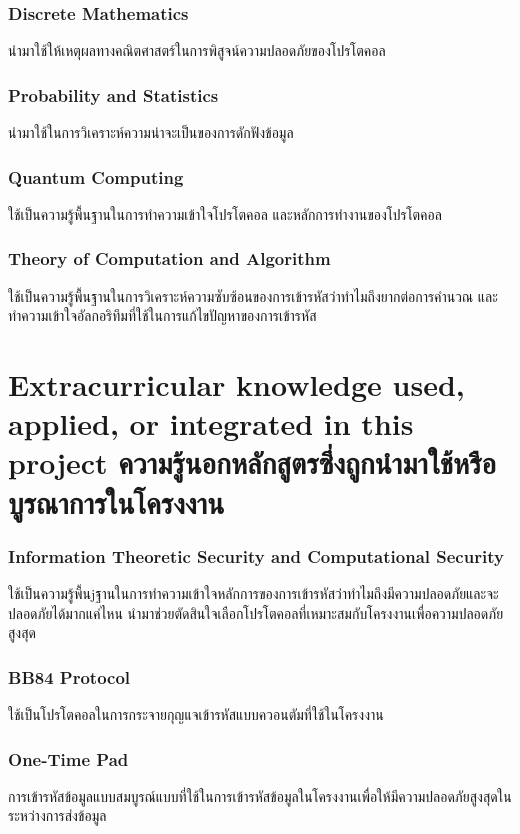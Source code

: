 \subsubsection{Discrete Mathematics}
นำมาใช้ให้เหตุผลทางคณิตศาสตร์ในการพิสูจน์ความปลอดภัยของโปรโตคอล
\subsubsection{Probability and Statistics}
นำมาใช้ในการวิเคราะห์ความน่าจะเป็นของการดักฟังข้อมูล
\subsubsection{Quantum Computing}
ใช้เป็นความรู้พื้นฐานในการทำความเข้าใจโปรโตคอล และหลักการทำงานของโปรโตคอล
\subsubsection{Theory of Computation and Algorithm}
ใช้เป็นความรู้พื้นฐานในการวิเคราะห์ความซับซ้อนของการเข้ารหัสว่าทำไมถึงยากต่อการคำนวณ และทำความเข้าใจอัลกอริทึมที่ใช้ในการแก้ไขปัญหาของการเข้ารหัส

\section{\ifenglish%
Extracurricular knowledge used, applied, or integrated in this project
\else%
ความรู้นอกหลักสูตรซึ่งถูกนำมาใช้หรือบูรณาการในโครงงาน
\fi
}
\subsubsection{Information Theoretic Security and Computational Security}
ใช้เป็นความรู้พื้นjฐานในการทำความเข้าใจหลักการของการเข้ารหัสว่าทำไมถึงมีความปลอดภัยและจะปลอดภัยได้มากแค่ไหน
นำมาช่วยตัดสินใจเลือกโปรโตคอลที่เหมาะสมกับโครงงานเพื่อความปลอดภัยสูงสุด
\subsubsection{BB84 Protocol}
ใช้เป็นโปรโตคอลในการกระจายกุญแจเข้ารหัสแบบควอนตัมที่ใช้ในโครงงาน
\subsubsection{One-Time Pad}
การเข้ารหัสข้อมูลแบบสมบูรณ์แบบที่ใช้ในการเข้ารหัสข้อมูลในโครงงานเพื่อให้มีความปลอดภัยสูงสุดในระหว่างการส่งข้อมูล